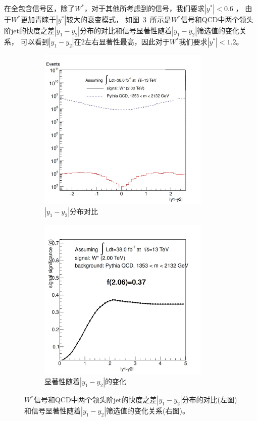 在全包含信号区，除了$W^*$，对于其他所考虑到的信号，我们要求$|y^*|<0.6$ ，
由于$W^*$更加青睐于$|y^*|$较大的衰变模式，
如图~\ref{fig:Selection1}~所示是$W^*$信号和QCD中两个领头阶jet的快度之差$|y_1-y_2|$分布的对比和信号显著性随着$|y_1-y_2|$筛选值的变化关系，
可以看到$|y_1-y_2|$在2左右显著性最高，因此对于$W^*$我们要求$|y^*|<1.2$。

\begin{figure}[htbp]
  \begin{subfigure}{.5\textwidth}
  \centering
   \includegraphics[width=0.9\textwidth]{figuresDijet/03-BenchmarkSignals/DeltaY.jpg}
   \caption{$|y_1-y_2|$分布对比}
   \label{fig:QStar}
  \end{subfigure}
  \begin{subfigure}{.5\textwidth}
  \centering
   \includegraphics[width=0.9\textwidth]{figuresDijet/03-BenchmarkSignals/Significance.jpg}
   \caption{显著性随着$|y_1-y_2|$的变化}
   \label{fig:QBH}
  \end{subfigure}
  \caption{$W^*$信号和QCD中两个领头阶jet的快度之差$|y_1-y_2|$分布的对比(左图)和信号显著性随着$|y_1-y_2|$筛选值的变化关系(右图)。}
  \label{fig:Selection1}
\end{figure} 

